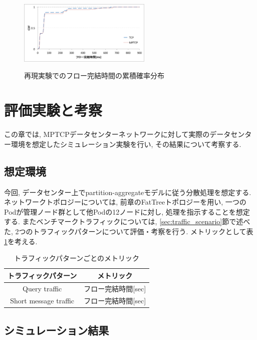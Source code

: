 \documentclass[11pt, a4paper, uplatex]{jsarticle}
\begin{document}
\begin{figure}[h]
    \begin{center}
    \includegraphics[autoebb, width=180pt]{./img/cdf_rep.pdf}
    \caption{再現実験でのフロー完結時間の累積確率分布}
    \label{fig:cdf}
    \end{center}
\end{figure}

\section{評価実験と考察}
\label{sec:evaluation}
この章では, MPTCPデータセンターネットワークに対して実際のデータセンター環境を想定したシミュレーション実験を行い, その結果について考察する.

\subsection{想定環境}
今回, データセンター上でpartition-aggregateモデルに従う分散処理を想定する.
ネットワークトポロジーについては, 前章のFatTreeトポロジーを用い, 一つのPodが管理ノード群として他Podの12ノードに対し,
処理を指示することを想定する.
またベンチマークトラフィックについては, \ref{sec:traffic_scenario}節で述べた, 2つのトラフィックパターンについて評価・考察を行う.
メトリックとして表\ref{metric}を考える.
\begin{table}[h]
\begin{center}
\begin{tabular}{c|c}
\hline
トラフィックパターン & メトリック \\ \hline \hline
Query traffic & フロー完結時間[sec] \\
Short message traffic & フロー完結時間[sec] \\
\hline
\end{tabular}
\caption{トラフィックパターンごとのメトリック}
\label{metric}
\end{center}
\end{table}

\subsection{シミュレーション結果}
\end{document}
